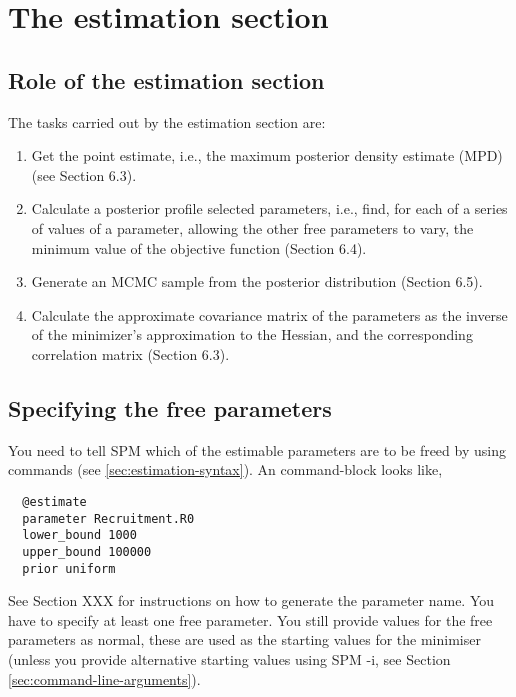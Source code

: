 \section{The estimation section\label{sec:estimation-section}}

\subsection{Role of the estimation section\label{sec:role-of-the-estimation-section}}

The tasks carried out by the estimation section are: 

\begin{enumerate}
\item Get the point estimate, i.e., the maximum posterior density estimate (MPD) (see Section 6.3).

\item Calculate a posterior profile selected parameters, i.e., find, for each of a series of values of a parameter, allowing the other free parameters to vary, the minimum value of the objective function (Section 6.4).

\item Generate an MCMC sample from the posterior distribution (Section 6.5).

\item Calculate the approximate covariance matrix of the parameters as the inverse of the minimizer\textquoteright{}s approximation to the Hessian, and the corresponding correlation matrix (Section 6.3).
\end{enumerate}

\subsection{Specifying the free parameters}

You need to tell SPM which of the estimable parameters are to be freed by using  commands (see \ref{sec:estimation-syntax}). An  command-block looks like,

\begin{verbatim}
  @estimate
  parameter Recruitment.R0
  lower_bound 1000
  upper_bound 100000
  prior uniform
\end{verbatim}

See Section XXX for instructions on how to generate the parameter name. You have to specify at least one free parameter. You still provide values for the free parameters as normal, these are used as the starting values for the minimiser (unless you provide alternative starting values using SPM -i, see Section \ref{sec:command-line-arguments}).

